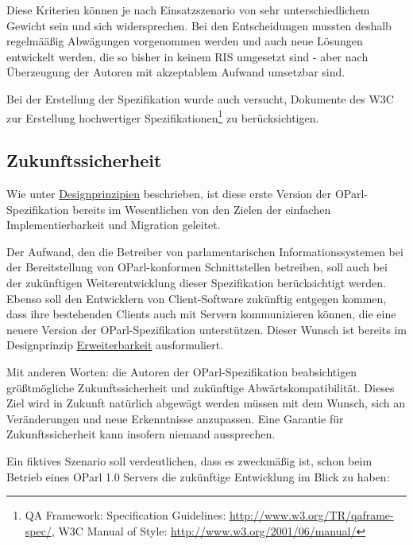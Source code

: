 \documentclass[,a4paper]{article}
\begin{document}
Diese Kriterien können je nach Einsatzszenario von sehr
unterschiedlichem Gewicht sein und sich widersprechen. Bei den
Entscheidungen mussten deshalb regelmääßig Abwägungen vorgenommen werden
und auch neue Lösungen entwickelt werden, die so bisher in keinem RIS
umgesetzt sind - aber nach Überzeugung der Autoren mit akzeptablem
Aufwand umsetzbar sind.

Bei der Erstellung der Spezifikation wurde auch versucht, Dokumente des
W3C zur Erstellung hochwertiger Spezifikationen\footnote{QA Framework:
  Specification Guidelines: \url{http://www.w3.org/TR/qaframe-spec/},
  W3C Manual of Style: \url{http://www.w3.org/2001/06/manual/}} zu
berücksichtigen.

\subsection{Zukunftssicherheit}\label{zukunftssicherheit}

Wie unter \hyperref[designprinzipien]{Designprinzipien} beschrieben, ist
diese erste Version der OParl-Spezifikation bereits im Wesentlichen von
den Zielen der einfachen Implementierbarkeit und Migration geleitet.

Der Aufwand, den die Betreiber von parlamentarischen
Informationssystemen bei der Bereitstellung von OParl-konformen
Schnittstellen betreiben, soll auch bei der zukünftigen
Weiterentwicklung dieser Spezifikation berücksichtigt werden. Ebenso
soll den Entwicklern von Client-Software zukünftig entgegen kommen, dass
ihre bestehenden Clients auch mit Servern kommunizieren können, die eine
neuere Version der OParl-Spezifikation unterstützen. Dieser Wunsch ist
bereits im Designprinzip \hyperref[erweiterbarkeit]{Erweiterbarkeit}
ausformuliert.

Mit anderen Worten: die Autoren der OParl-Spezifikation beabsichtigen
größtmögliche Zukunftssicherheit und zukünftige Abwärtskompatibilität.
Dieses Ziel wird in Zukunft natürlich abgewägt werden müssen mit dem
Wunsch, sich an Veränderungen und neue Erkenntnisse anzupassen. Eine
Garantie für Zukunftssicherheit kann insofern niemand aussprechen.

Ein fiktives Szenario soll verdeutlichen, dass es zweckmäßig ist, schon
beim Betrieb eines OParl 1.0 Servers die zukünftige Entwicklung im Blick
zu haben:
\end{document}
